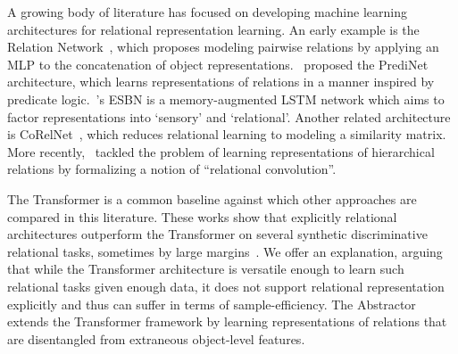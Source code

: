 
% 

A growing body of literature has focused on developing machine learning architectures for relational representation learning. An early example is the Relation Network~\citep{santoro1}, which proposes modeling pairwise relations by applying an MLP to the concatenation of object representations.~\citet{shanahanExplicitlyRelationalNeural} proposed the PrediNet architecture, which learns representations of relations in a manner inspired by predicate logic.~\citet{esbn}'s ESBN is a memory-augmented LSTM network which aims to factor representations into `sensory' and `relational'. Another related architecture is CoRelNet~\citep{kerg2022neural}, which reduces relational learning to modeling a similarity matrix. More recently,~\citet{altabaaRelationalConvolutionalNetworks2023} tackled the problem of learning representations of hierarchical relations by formalizing a notion of ``relational convolution''.

The Transformer is a common baseline against which other approaches are compared in this literature. These works show that explicitly relational architectures outperform the Transformer on several synthetic discriminative relational tasks, sometimes by large margins~\citep{shanahanExplicitlyRelationalNeural,esbn,kerg2022neural,altabaaRelationalConvolutionalNetworks2023}. We offer an explanation, arguing that while the Transformer architecture is versatile enough to learn such relational tasks given enough data, it does not support relational representation explicitly and thus can suffer in terms of sample-efficiency. The Abstractor extends the Transformer framework by learning representations of relations that are disentangled from extraneous object-level features.

